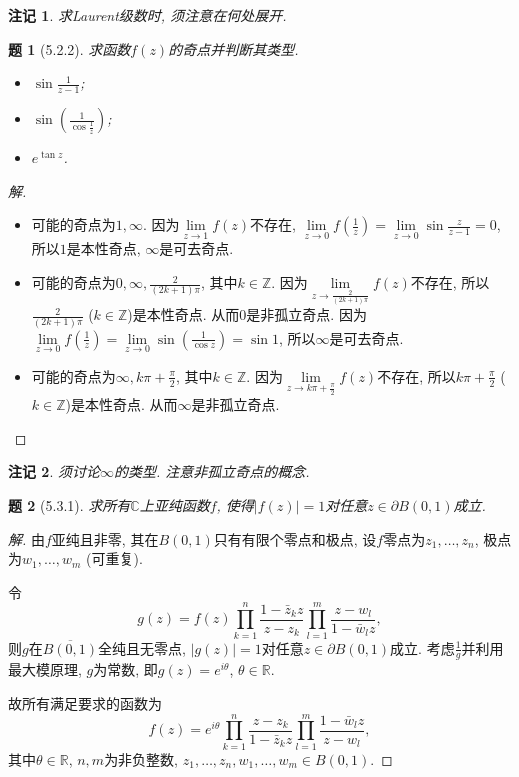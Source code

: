 \documentclass{article}[a4paper, 12pt]
\theoremstyle{mystyle}
\newtheorem{problem}{题}
\newtheorem*{remark}{注记}
\newenvironment{solution}{\begin{proof}[解]}{\end{proof}}
\begin{document}
\begin{remark}
  求Laurent级数时, 须注意在何处展开.
\end{remark}

\begin{problem}[5.2.2]
  求函数\(f(z)\)的奇点并判断其类型.
  \begin{itemize}
    \item [(3)] \(\sin\frac{1}{z-1}\);
    \item [(7)] \(\sin\left(\frac{1}{\cos\frac{1}{z}}\right)\);
    \item [(8)] \(e^{\tan z}\).
  \end{itemize}
\end{problem}

\begin{solution}
  \begin{itemize}
    \item [(3)] 可能的奇点为\(1,\infty\). 因为\(\lim\limits_{z\to1}f(z)\)不存在, \(\lim\limits_{z\to0}f\left(\frac{1}{z}\right)=\lim\limits_{z\to0}\sin\frac{z}{z-1}=0\), 所以\(1\)是本性奇点, \(\infty\)是可去奇点.
    \item [(7)] 可能的奇点为\(0,\infty,\frac{2}{(2k+1)\pi}\), 其中\(k\in\mathbb Z\). 因为\(\lim\limits_{z\to\frac{2}{(2k+1)\pi}}f(z)\)不存在, 所以\(\frac{2}{(2k+1)\pi}\) (\(k\in\mathbb Z\))是本性奇点. 从而\(0\)是非孤立奇点. 因为\(\lim\limits_{z\to 0}f\left(\frac{1}{z}\right)=\lim\limits_{z\to 0}\sin\left(\frac{1}{\cos z}\right)=\sin 1\), 所以\(\infty\)是可去奇点.
    \item [(8)] 可能的奇点为\(\infty, k\pi+\frac\pi2\), 其中\(k\in\mathbb Z\). 因为\(\lim\limits_{z\to k\pi+\frac\pi2}f(z)\)不存在, 所以\(k\pi+\frac\pi2\) (\(k\in\mathbb Z\))是本性奇点. 从而\(\infty\)是非孤立奇点. \qedhere
  \end{itemize}
\end{solution}

\begin{remark}
  须讨论\(\infty\)的类型. 注意非孤立奇点的概念.
\end{remark}

\begin{problem}[5.3.1]
  求所有\(\mathbb C\)上亚纯函数\(f\), 使得\(|f(z)|=1\)对任意\(z\in\partial B(0,1)\)成立.
\end{problem}

\begin{solution}
  由\(f\)亚纯且非零, 其在\(B(0,1)\)只有有限个零点和极点, 设\(f\)零点为\(z_1,\dots,z_n\), 极点为\(w_1,\dots,w_m\) (可重复). 

  令\[g(z)=f(z)\prod_{k=1}^{n}\frac{1-\bar{z}_kz}{z-z_k}\prod_{l=1}^{m}\frac{z-w_l}{1-\bar{w}_lz},\] 则\(g\)在\(\overline{B(0,1)}\)全纯且无零点, \(|g(z)|=1\)对任意\(z\in\partial B(0,1)\)成立. 考虑\(\frac1g\)并利用最大模原理, \(g\)为常数, 即\(g(z)=e^{i\theta}\), \(\theta\in\mathbb R\).

  故所有满足要求的函数为\[f(z)=e^{i\theta}\prod_{k=1}^{n}\frac{z-z_k}{1-\bar{z}_kz}\prod_{l=1}^{m}\frac{1-\bar{w}_lz}{z-w_l},\] 其中\(\theta\in\mathbb R\), \(n,m\)为非负整数, \(z_1,\dots,z_n,w_1,\dots,w_m\in B(0,1)\).
\end{solution}
\end{document}
